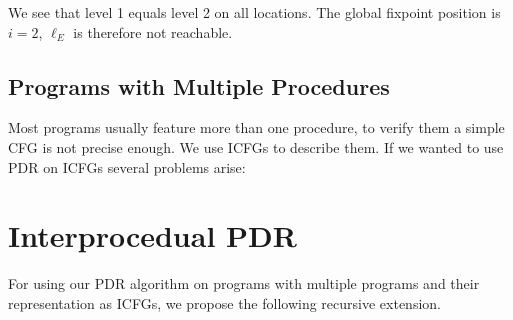 \documentclass{article}
\newcommand\mycom[1]{}
\newcommand\mycom[1]{#1}
\newcommand{\jw}[1]{\mycom{\todo[color=blue!40,inline]{\small JW: #1}}}
\begin{document}
	\hspace*{5cm}
	
	We see that level 1 equals level 2 on all locations. The global fixpoint position is $i = 2$, $\ell_E$ is therefore not reachable.
	
	\subsection{Programs with Multiple Procedures}
	Most programs usually feature more than one procedure, to verify them a simple CFG is not precise enough. We use ICFGs to describe them. If we wanted to use PDR on ICFGs several problems arise:
	\jw{Explain why normal PDR does not work on procedures.}
	
	\section{Interprocedual PDR}
	For using our PDR algorithm on programs with multiple programs and their representation as ICFGs, we propose the following recursive extension.
\end{document}
